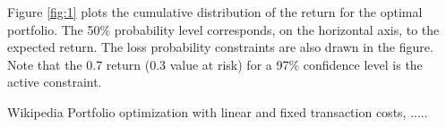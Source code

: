 \documentclass[a4paper]{article}
\begin{document}
Figure \ref{fig:1} plots the cumulative distribution of the return for the optimal portfolio. The
50\% probability level corresponds, on the horizontal axis, to the expected return. The loss
probability constraints are also drawn in the figure. Note that the 0.7 return (0.3 value at risk)
for a 97\% confidence level is the active constraint.




\begin{thebibliography}{10}

 Wikipedia
 Portfolio optimization with linear and fixed transaction costs, .....
\end{thebibliography}
\end{document}
